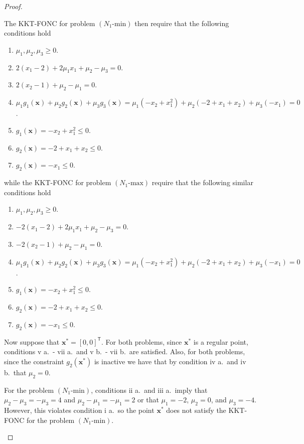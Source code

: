 \documentclass[12pt]{article}
\theoremstyle{definition}
\newcommand{\vc}[1]{\boldsymbol{#1}}
\newcommand{\tran}{\mathsf{T}}
\begin{document}
\begin{proof}
\begin{enumerate}
      The KKT-FONC for problem $(N_1\text{-min})$ then require that the following conditions hold
      \begin{enumerate}[label=\roman* a.]
        \item $\mu_1, \mu_2, \mu_3 \geq 0$.
        \item $2 (x_1-2)+ 2\mu_1 x_1 + \mu_2 -\mu_3 = 0$.
        \item $2 (x_2 - 1) + \mu_2 -\mu_1 = 0$.
        \item $\mu_1 g_1(\vc{x}) + \mu_2 g_2(\vc{x}) + \mu_3 g_3(\vc{x}) = \mu_1(-x_2 + x_1^2) + \mu_2(-2 + x_1 + x_2) + \mu_3(-x_1) = 0$.
        \item $g_1(\vc{x}) = -x_2 + x_1^2 \leq 0$.
        \item $g_2(\vc{x}) = -2 + x_1 + x_2 \leq 0$.
        \item $g_2(\vc{x}) = -x_1 \leq 0$.
      \end{enumerate}
      while the KKT-FONC for problem $(N_1\text{-max})$ require that the following similar conditions hold
      \begin{enumerate}[label=\roman* b.]
        \item $\mu_1, \mu_2, \mu_3 \geq 0$.
        \item $-2 (x_1-2)+ 2\mu_1 x_1 + \mu_2 -\mu_3 = 0$.
        \item $-2 (x_2 - 1) + \mu_2 -\mu_1 = 0$.
        \item $\mu_1 g_1(\vc{x}) + \mu_2 g_2(\vc{x}) + \mu_3 g_3(\vc{x}) = \mu_1(-x_2 + x_1^2) + \mu_2(-2 + x_1 + x_2) + \mu_3(-x_1) = 0$.
        \item $g_1(\vc{x}) = -x_2 + x_1^2 \leq 0$.
        \item $g_2(\vc{x}) = -2 + x_1 + x_2 \leq 0$.
        \item $g_2(\vc{x}) = -x_1 \leq 0$.
      \end{enumerate}
      Now suppose that $\vc{x}^* = [0,0]^\tran$. For both problems, since $\vc{x}^*$ is a
      regular point, conditions v a.\ - vii a.\ and v b.\ - vii b.\ are satisfied.
      Also, for both problems, since the constraint $g_2(\vc{x}^*)$ is inactive we have that
      by condition iv a.\ and iv b.\ that $\mu_2 = 0$.

      For the problem $(N_1\text{-min})$, conditions
      ii a.\ and iii a.\ imply that $\mu_2 - \mu_3 = -\mu_3 = 4$ and $\mu_2 - \mu_1 = -\mu_1 = 2$
      or that $\mu_1 = -2$, $\mu_2 = 0$, and $\mu_3 = -4$. However, this violates condition i a.\
      so the point $\vc{x}^*$ does not satisfy the KKT-FONC for the problem $(N_1\text{-min})$.


\end{enumerate}
\end{proof}
\end{document}
